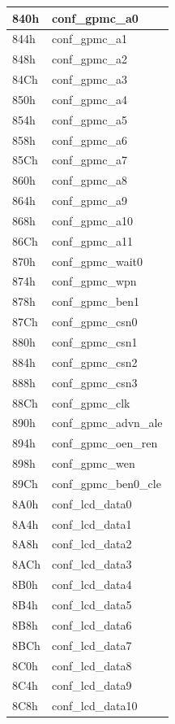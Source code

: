 \begin{longtable}{ | M{7.5cm} | M{7.5cm} |}
	840h & conf\_gpmc\_a0 \\ \hline
	844h & conf\_gpmc\_a1 \\ \hline
	848h & conf\_gpmc\_a2 \\ \hline
	84Ch & conf\_gpmc\_a3 \\ \hline
	850h & conf\_gpmc\_a4 \\ \hline
	854h & conf\_gpmc\_a5 \\ \hline
	858h & conf\_gpmc\_a6 \\ \hline
	85Ch & conf\_gpmc\_a7 \\ \hline
	860h & conf\_gpmc\_a8 \\ \hline
	864h & conf\_gpmc\_a9 \\ \hline
	868h & conf\_gpmc\_a10 \\ \hline
	86Ch & conf\_gpmc\_a11 \\ \hline
	870h & conf\_gpmc\_wait0 \\ \hline
	874h & conf\_gpmc\_wpn \\ \hline
	878h & conf\_gpmc\_ben1 \\ \hline
	87Ch & conf\_gpmc\_csn0 \\ \hline
	880h & conf\_gpmc\_csn1 \\ \hline
	884h & conf\_gpmc\_csn2 \\ \hline
	888h & conf\_gpmc\_csn3 \\ \hline
	88Ch & conf\_gpmc\_clk \\ \hline
	890h & conf\_gpmc\_advn\_ale \\ \hline
	894h & conf\_gpmc\_oen\_ren \\ \hline
	898h & conf\_gpmc\_wen \\ \hline
	89Ch & conf\_gpmc\_ben0\_cle \\ \hline
	8A0h & conf\_lcd\_data0 \\ \hline
	8A4h & conf\_lcd\_data1 \\ \hline
	8A8h & conf\_lcd\_data2 \\ \hline
	8ACh & conf\_lcd\_data3 \\ \hline
	8B0h & conf\_lcd\_data4 \\ \hline
	8B4h & conf\_lcd\_data5 \\ \hline
	8B8h & conf\_lcd\_data6 \\ \hline
	8BCh & conf\_lcd\_data7 \\ \hline
	8C0h & conf\_lcd\_data8 \\ \hline
	8C4h & conf\_lcd\_data9 \\ \hline
	8C8h & conf\_lcd\_data10 \\ \hline

\end{longtable}
